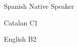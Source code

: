 
\begin{cvskills}

  \cvskill
    {Spanish} %
    {Native Speaker}

  \cvskill
    {Catalan} %
    {C1} %

  \cvskill
    {English} %
    {B2} %

\end{cvskills}
